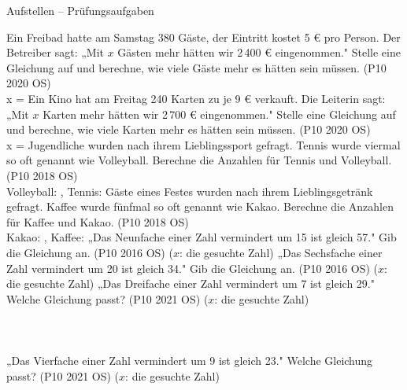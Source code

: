 \begin{aufgabe}{Aufstellen – Prüfungsaufgaben}
\begin{teile}
\steil Ein Freibad hatte am Samstag 380 Gäste, der Eintritt kostet 5 € pro Person. Der Betreiber sagt: „Mit $x$ Gästen mehr hätten wir 2\,400 € eingenommen." Stelle eine Gleichung auf und berechne, wie viele Gäste mehr es hätten sein müssen. \hfill (P10 2020 OS) \\ x = \leerfeld
\steil Ein Kino hat am Freitag 240 Karten zu je 9 € verkauft. Die Leiterin sagt: „Mit $x$ Karten mehr hätten wir 2\,700 € eingenommen." Stelle eine Gleichung auf und berechne, wie viele Karten mehr es hätten sein müssen. \hfill (P10 2020 OS) \\ x = \leerfeld
{} Jugendliche wurden nach ihrem Lieblingssport gefragt. Tennis wurde viermal so oft genannt wie Volleyball. Berechne die Anzahlen für Tennis und Volleyball. \hfill (P10 2018 OS) \\

Volleyball: \leerfeld , Tennis: \leerfeld
{} Gäste eines Festes wurden nach ihrem Lieblingsgetränk gefragt. Kaffee wurde fünfmal so oft genannt wie Kakao. Berechne die Anzahlen für Kaffee und Kakao. \hfill (P10 2018 OS) \\

Kakao: \leerfeld , Kaffee: \leerfeld
\teil „Das Neunfache einer Zahl vermindert um 15 ist gleich 57." Gib die Gleichung an. \hfill (P10 2016 OS) ($x$: die gesuchte Zahl)
\teil „Das Sechsfache einer Zahl vermindert um 20 ist gleich 34." Gib die Gleichung an. \hfill (P10 2016 OS) ($x$: die gesuchte Zahl)
\teil „Das Dreifache einer Zahl vermindert um 7 ist gleich 29." Welche Gleichung passt? \hfill (P10 2021 OS) ($x$: die gesuchte Zahl) \\  \\  \\  \\ 
\teil „Das Vierfache einer Zahl vermindert um 9 ist gleich 23." Welche Gleichung passt? \hfill (P10 2021 OS) ($x$: die gesuchte Zahl) \\  \\  \\  \\ 
\end{teile}
\end{aufgabe}
